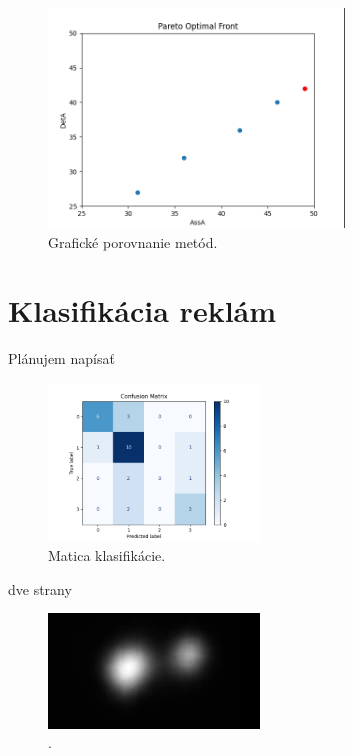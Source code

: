 \begin{figure}[ht]
    \centering
    \includegraphics[width=0.7\textwidth]{images/05/front.png}
    \caption{Grafické porovnanie metód.}
    \label{img:road}
\end{figure}



\section{Klasifikácia reklám}

Plánujem napísať

\begin{figure}[ht]
    \centering
    \includegraphics[width=0.5\textwidth]{images/05/rfc.png}
    \caption{Matica klasifikácie.}
    \label{img:road}
\end{figure}

\newpage

dve strany

\begin{figure}[ht]
    \centering
    \includegraphics[width=0.5\textwidth]{images/05/frame.png}
    \caption{.}
    \label{img:Saliency map.}
\end{figure}

